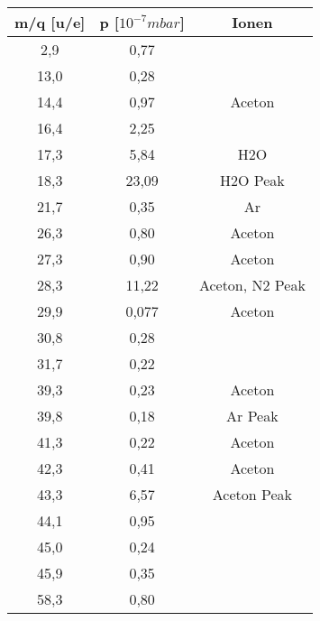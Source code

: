 \begin{center}
\begin{tabular}{c|c|c}
m/q [u/e] & p [$10^{-7} mbar$] & Ionen\\	
\hline	
2,9 &	0,77 &\\
13,0 &	0,28 &\\
14,4 &	0,97 & Aceton\\
16,4 &	2,25 &\\
17,3 &	5,84 & H2O\\
18,3 &	23,09 & H2O Peak\\
21,7 &	0,35 & Ar\\
26,3 &	0,80 & Aceton\\
27,3 &	0,90 & Aceton\\
28,3 &	11,22 & Aceton, N2 Peak\\
29,9 &	0,077 & Aceton\\
30,8 &	0,28 &\\
31,7 &	0,22 &\\
39,3 &	0,23 & Aceton\\
39,8 &	0,18 & Ar Peak\\
41,3 &	0,22 & Aceton\\
42,3 &	0,41 & Aceton\\
43,3 &	6,57 & Aceton Peak\\
44,1 &	0,95 &\\
45,0 &	0,24 &\\
45,9 &	0,35 &\\
58,3 &	0,80 &\\
\end{tabular}
\end{center}


